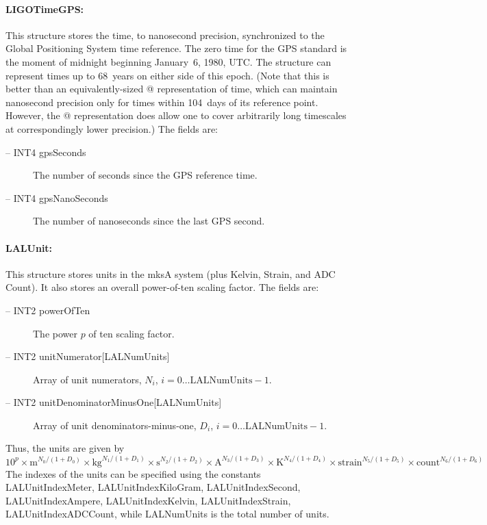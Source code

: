 \documentclass[10pt]{ligodcc}
\renewcommand{\texttt}[1]{{\ttfamily\color{blue}#1}}
\begin{document}
\paragraph{\texttt{LIGOTimeGPS}:}
This structure stores the time, to nanosecond precision, synchronized
to the Global Positioning System time reference.  The zero time for
the GPS standard is the moment of midnight beginning January~6, 1980,
UTC.  The \verb@LIGOTimeGPS@ structure can represent times up to
68~years on either side of this epoch.  (Note that this is better than
an equivalently-sized @ representation of time, which can
maintain nanosecond precision only for times within 104~days of its
reference point.  However, the @ representation does allow
one to cover arbitrarily long timescales at correspondingly lower
precision.)  The fields are:
\begin{description}
\item[-- \texttt{INT4 gpsSeconds}] The number of seconds since the GPS
reference time.
\item[-- \texttt{INT4 gpsNanoSeconds}] The number of nanoseconds since
the last GPS second.
\end{description}


\paragraph{\texttt{LALUnit}:}
This structure stores units in the mksA system (plus Kelvin, Strain,
and ADC Count).  It also stores an overall power-of-ten scaling factor.
The fields are:
\begin{description}
\item[-- \texttt{INT2 powerOfTen}] The power $p$ of ten scaling factor.
\item[-- \texttt{INT2 unitNumerator[LALNumUnits]}] Array of unit numerators,
  $N_i$, $i=0\ldots\textrm{LALNumUnits}-1$.
\item[-- \texttt{INT2 unitDenominatorMinusOne[LALNumUnits]}] Array of unit
  denominators-minus-one, $D_i$, $i=0\ldots\textrm{LALNumUnits}-1$.
\end{description}
Thus, the units are given by
\begin{equation}
  10^p\times\textrm{m}^{N_0/(1+D_0)}\times\textrm{kg}^{N_1/(1+D_1)}
  \times\textrm{s}^{N_2/(1+D_2)}\times\textrm{A}^{N_3/(1+D_3)}
  \times\textrm{K}^{N_4/(1+D_4)}\times\textrm{strain}^{N_5/(1+D_5)}
  \times\textrm{count}^{N_6/(1+D_6)}
\end{equation}
The indexes of the units can be specified using the constants
\texttt{LALUnitIndexMeter},
\texttt{LALUnitIndexKiloGram},
\texttt{LALUnitIndexSecond},
\texttt{LALUnitIndexAmpere},
\texttt{LALUnitIndexKelvin},
\texttt{LALUnitIndexStrain},
\texttt{LALUnitIndexADCCount},
while \texttt{LALNumUnits} is the total number of units.
\end{document}
